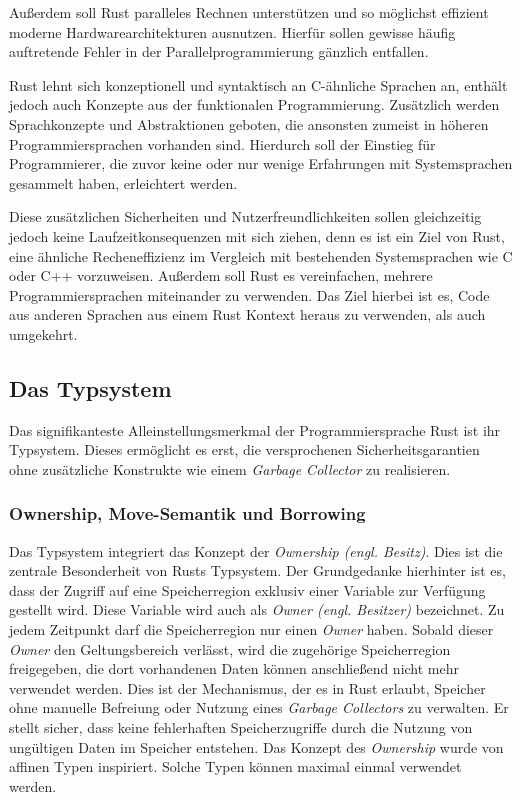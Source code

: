 Außerdem soll Rust paralleles Rechnen unterstützen und
so möglichst effizient moderne Hardwarearchitekturen ausnutzen.
Hierfür sollen gewisse häufig auftretende Fehler in der Parallelprogrammierung gänzlich entfallen.
\cite{theRustLanguage}

Rust lehnt sich konzeptionell und syntaktisch an C-ähnliche Sprachen an, enthält jedoch auch Konzepte aus der
funktionalen Programmierung. Zusätzlich werden Sprachkonzepte und Abstraktionen geboten, die
ansonsten zumeist in höheren Programmiersprachen vorhanden sind. Hierdurch soll der Einstieg für
Programmierer, die zuvor keine oder nur wenige Erfahrungen mit Systemsprachen gesammelt haben, erleichtert werden.
\cite{engineeringServo}

Diese zusätzlichen Sicherheiten und Nutzerfreundlichkeiten sollen gleichzeitig jedoch keine Laufzeitkonsequenzen mit 
sich ziehen, denn es ist ein Ziel von Rust, 
eine ähnliche Recheneffizienz im Vergleich mit bestehenden Systemsprachen wie C oder C++ vorzuweisen.
Außerdem soll Rust es vereinfachen, mehrere Programmiersprachen miteinander zu verwenden.
Das Ziel hierbei ist es, Code aus anderen Sprachen aus einem Rust Kontext heraus zu verwenden, als auch umgekehrt.
\cite{rustBook}


\subsection{Das Typsystem}

Das signifikanteste Alleinstellungsmerkmal der Programmiersprache Rust ist ihr Typsystem. Dieses ermöglicht es
erst, die versprochenen Sicherheitsgarantien ohne zusätzliche Konstrukte wie einem \textit{Garbage Collector}
zu realisieren.\cite{rustBook}

\subsubsection{Ownership, Move-Semantik und Borrowing}

Das Typsystem integriert das Konzept der \textit{Ownership (engl. Besitz)}.
Dies ist die zentrale Besonderheit von Rusts Typsystem.
Der Grundgedanke hierhinter ist es, dass der Zugriff auf eine Speicherregion exklusiv einer Variable
zur Verfügung gestellt wird. Diese Variable wird auch als \textit{Owner (engl. Besitzer)} bezeichnet.
Zu jedem Zeitpunkt darf die Speicherregion nur einen \textit{Owner} haben.
Sobald dieser \textit{Owner} den Geltungsbereich verlässt, wird die zugehörige Speicherregion freigegeben,
die dort vorhandenen Daten können anschließend nicht mehr verwendet werden.
Dies ist der Mechanismus, der es in Rust erlaubt, Speicher ohne manuelle Befreiung oder Nutzung eines
\textit{Garbage Collectors} zu verwalten. Er stellt sicher, dass keine fehlerhaften Speicherzugriffe
durch die Nutzung von ungültigen Daten im Speicher entstehen.\cite{rustBook}
Das Konzept des \textit{Ownership} wurde von affinen Typen inspiriert.\cite{embeddedRustOS}
Solche Typen können maximal einmal verwendet werden.\cite{affineTypes}

